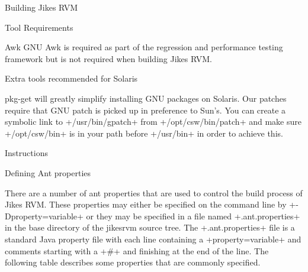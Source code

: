 \begin{section}{Building Jikes RVM}
\begin{subsection}{Tool Requirements}
\begin{subsubsection}{Awk}
GNU Awk is required as part of the regression and performance testing framework but is not required when building Jikes RVM.

\end{subsubsection}

\end{subsection}

\begin{subsubsection}{Extra tools recommended for Solaris}

pkg-get will greatly simplify installing GNU packages on Solaris. Our patches require that GNU patch is picked up in preference to Sun's. You can create a symbolic link to \spverb+/usr/bin/gpatch+ from \spverb+/opt/csw/bin/patch+ and make sure \spverb+/opt/csw/bin+ is in your path before \spverb+/usr/bin+ in order to achieve this.

\end{subsubsection}

\begin{subsection}{Instructions}

\begin{subsubsection}{Defining Ant properties}

There are a number of ant properties that are used to control the build process of Jikes RVM. These properties may either be specified on the command line by \spverb+-Dproperty=variable+ or they may be specified in a file named \spverb+.ant.properties+ in the base directory of the jikesrvm source tree. The \spverb+.ant.properties+ file is a standard Java property file with each line containing a \spverb+property=variable+ and comments starting with a \spverb+#+ and finishing at the end of the line. The following table describes some properties that are commonly specified.



\end{subsubsection}
\end{subsection}
\end{section}
